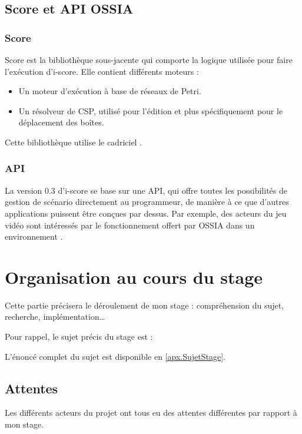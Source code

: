 \subsection{Score et API OSSIA}
\subsubsection{Score}
Score est la bibliothèque sous-jacente qui comporte la logique utilisée pour faire l'exécution d'i-score. Elle contient différents moteurs :

\begin{itemize}
	\item Un moteur d'exécution à base de réseaux de Petri.
	\item Un résolveur de \ac{CSP}, utilisé pour l'édition et plus spécifiquement pour le déplacement des boîtes.
\end{itemize}

Cette bibliothèque utilise le cadriciel .

\subsubsection{API}
La version 0.3 d'i-score se base sur une \ac{API}, qui offre toutes les possibilités de gestion de scénario directement au programmeur, de manière à ce que d'autres applications puissent être conçues par dessus. Par exemple, des acteurs du jeu vidéo sont intéressés par le fonctionnement offert par \ac{OSSIA} dans un environnement . 

\section{Organisation au cours du stage}
Cette partie précisera le déroulement de mon stage : compréhension du sujet, recherche, implémentation\dots

Pour rappel, le sujet précis du stage est : 
\begin{center}
	\noindent{}
\end{center}

L'énoncé complet du sujet est disponible en \cref{apx.SujetStage}.
\subsection{Attentes}
\label{sectionAttentes}
Les différents acteurs du projet ont tous eu des attentes différentes par rapport à mon stage.

